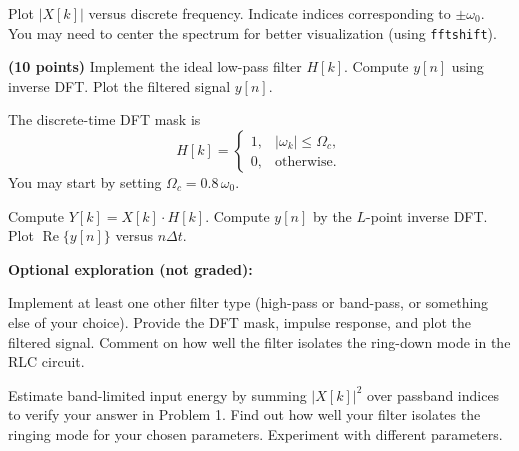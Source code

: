 \documentclass{ee102_pset}
\begin{document}
Plot \(|X[k]|\) versus discrete frequency. Indicate indices corresponding to \(\pm\omega_0\). You may need to center the spectrum for better visualization (using \texttt{fftshift}).

\problempart \textbf{(10 points)}
Implement the ideal low-pass filter $H[k]$. Compute \(y[n]\) using inverse DFT. Plot the filtered signal \(y[n]\).

The discrete-time DFT mask is
\[
H[k]=\begin{cases}
1,& |\omega_k|\le \Omega_c,\\
0,& \text{otherwise}.
\end{cases}
\]
You may start by setting \(\Omega_c = 0.8\,\omega_0\).

Compute \(Y[k]=X[k]\cdot H[k]\). Compute \(y[n]\) by the \(L\)-point inverse DFT. Plot \(\operatorname{Re}\{y[n]\}\) versus \(n\Delta t\).

\textbf{\color{blue}Optional exploration (not graded):}

\problempart Implement at least one other filter type (high-pass or band-pass, or something else of your choice). Provide the DFT mask, impulse response, and plot the filtered signal. Comment on how well the filter isolates the ring-down mode in the RLC circuit.


\problempart Estimate band-limited input energy by summing \(|X[k]|^2\) over passband indices to verify your answer in Problem 1. Find out how well your filter isolates the ringing mode for your chosen parameters. Experiment with different parameters.
\end{document}
